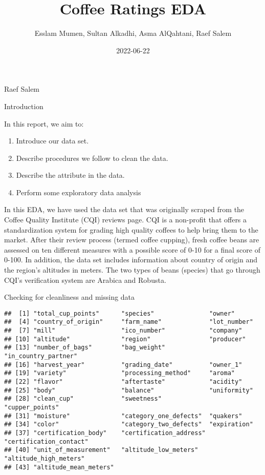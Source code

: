 \documentclass[
]{article}
\title{Coffee Ratings EDA}
\author{Esslam Mumen, Sultan Alkadhi, Asma AlQahtani, Raef Salem}
\date{2022-06-22}
\providecommand{\tightlist}{%
  \setlength{\itemsep}{0pt}\setlength{\parskip}{0pt}}
\begin{document}
\maketitle

Raef Salem

Introduction

In this report, we aim to:

\begin{enumerate}
\def\labelenumi{\arabic{enumi}.}
\tightlist
\item
  Introduce our data set.
\item
  Describe procedures we follow to clean the data.
\item
  Describe the attribute in the data.
\item
  Perform some exploratory data analysis
\end{enumerate}

In this EDA, we have used the data set that was originally scraped from
the Coffee Quality Institute (CQI) reviews page. CQI is a non-profit
that offers a standardization system for grading high quality coffees to
help bring them to the market. After their review process (termed coffee
cupping), fresh coffee beans are assessed on ten different measures with
a possible score of 0-10 for a final score of 0-100. In addition, the
data set includes information about country of origin and the region's
altitudes in meters. The two types of beans (species) that go through
CQI's verification system are Arabica and Robusta.

Checking for cleanliness and missing data

\begin{verbatim}
##  [1] "total_cup_points"      "species"               "owner"                
##  [4] "country_of_origin"     "farm_name"             "lot_number"           
##  [7] "mill"                  "ico_number"            "company"              
## [10] "altitude"              "region"                "producer"             
## [13] "number_of_bags"        "bag_weight"            "in_country_partner"   
## [16] "harvest_year"          "grading_date"          "owner_1"              
## [19] "variety"               "processing_method"     "aroma"                
## [22] "flavor"                "aftertaste"            "acidity"              
## [25] "body"                  "balance"               "uniformity"           
## [28] "clean_cup"             "sweetness"             "cupper_points"        
## [31] "moisture"              "category_one_defects"  "quakers"              
## [34] "color"                 "category_two_defects"  "expiration"           
## [37] "certification_body"    "certification_address" "certification_contact"
## [40] "unit_of_measurement"   "altitude_low_meters"   "altitude_high_meters" 
## [43] "altitude_mean_meters"
\end{verbatim}
\end{document}
